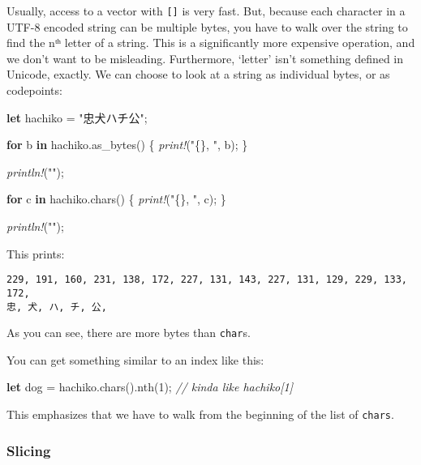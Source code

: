 \documentclass[a4paper,]{book}
\newenvironment{Shaded}{\begin{snugshade}}{\end{snugshade}}
\newcommand{\KeywordTok}[1]{\textcolor[rgb]{0.13,0.29,0.53}{\textbf{{#1}}}}
\newcommand{\DecValTok}[1]{\textcolor[rgb]{0.00,0.00,0.81}{{#1}}}
\newcommand{\StringTok}[1]{\textcolor[rgb]{0.31,0.60,0.02}{{#1}}}
\newcommand{\CommentTok}[1]{\textcolor[rgb]{0.56,0.35,0.01}{\textit{{#1}}}}
\newcommand{\PreprocessorTok}[1]{\textcolor[rgb]{0.56,0.35,0.01}{\textit{{#1}}}}
\newcommand{\NormalTok}[1]{{#1}}
\begin{document}
Usually, access to a vector with \texttt{{[}{]}} is very fast. But,
because each character in a UTF-8 encoded string can be multiple bytes,
you have to walk over the string to find the nᵗʰ letter of a string.
This is a significantly more expensive operation, and we don't want to
be misleading. Furthermore, `letter' isn't something defined in Unicode,
exactly. We can choose to look at a string as individual bytes, or as
codepoints:

\begin{Shaded}
\begin{Highlighting}[]
\KeywordTok{let} \NormalTok{hachiko = }\StringTok{"忠犬ハチ公"}\NormalTok{;}

\KeywordTok{for} \NormalTok{b }\KeywordTok{in} \NormalTok{hachiko.as_bytes() \{}
    \PreprocessorTok{print!}\NormalTok{(}\StringTok{"\{\}, "}\NormalTok{, b);}
\NormalTok{\}}

\PreprocessorTok{println!}\NormalTok{(}\StringTok{""}\NormalTok{);}

\KeywordTok{for} \NormalTok{c }\KeywordTok{in} \NormalTok{hachiko.chars() \{}
    \PreprocessorTok{print!}\NormalTok{(}\StringTok{"\{\}, "}\NormalTok{, c);}
\NormalTok{\}}

\PreprocessorTok{println!}\NormalTok{(}\StringTok{""}\NormalTok{);}
\end{Highlighting}
\end{Shaded}

This prints:

\begin{verbatim}
229, 191, 160, 231, 138, 172, 227, 131, 143, 227, 131, 129, 229, 133, 172, 
忠, 犬, ハ, チ, 公, 
\end{verbatim}

As you can see, there are more bytes than \texttt{char}s.

You can get something similar to an index like this:

\begin{Shaded}
\begin{Highlighting}[]
\KeywordTok{let} \NormalTok{dog = hachiko.chars().nth(}\DecValTok{1}\NormalTok{); }\CommentTok{// kinda like hachiko[1]}
\end{Highlighting}
\end{Shaded}

This emphasizes that we have to walk from the beginning of the list of
\texttt{chars}.

\subsubsection{Slicing}\label{slicing}
\end{document}
